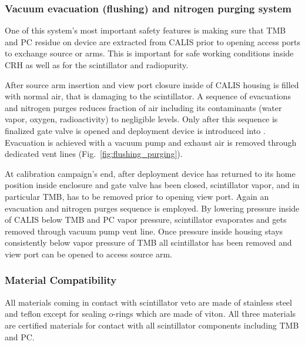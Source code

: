 \subsubsection*{Vacuum evacuation (flushing) and nitrogen purging system}\label{sec:EvacPurge}
One of this system's most important safety features is making sure that TMB and PC residue on device are extracted from CALIS prior to opening access ports to exchange source or arms. This is  important for safe working conditions inside CRH as well as for the scintillator and radiopurity. 

After source arm insertion and view port closure inside of CALIS housing is filled with normal air, that is damaging to the scintillator. A sequence of evacuations and nitrogen purges reduces fraction of air including its contaminants (water vapor, oxygen, radioactivity) to negligible levels. Only after this sequence is finalized gate valve is opened and deployment device is introduced into \lsv. Evacuation is achieved with a vacuum pump and exhaust air is removed through dedicated vent lines (Fig.~\ref{fig:flushing_purging}).

At calibration campaign's end, after deployment device has returned to its home position inside enclosure and gate valve has been closed, scintillator vapor, and in particular TMB, has to be removed prior to opening view port. Again an evacuation and nitrogen purges sequence is employed. By lowering pressure inside of CALIS below TMB and PC vapor pressure, scintillator evaporates and gets removed through vacuum pump vent line. Once pressure inside housing stays consistently below vapor pressure of TMB all scintillator has been removed and view port can be opened to access source arm.
 

\subsubsection*{Material Compatibility}
All materials coming in contact with scintillator veto are made of stainless steel and teflon except for sealing o-rings which are made of viton.  All three materials are certified materials for contact with all scintillator components including TMB and PC.

